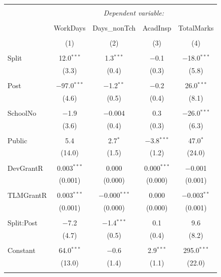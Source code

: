 \documentclass[12pt, a4paper]{article}
\begin{document}
\begin{table}[!htbp] \centering 
  \caption{} 
  \label{} 
\begin{tabular}{@{\extracolsep{5pt}}lcccc} 
\\[-1.8ex]\hline 
\hline \\[-1.8ex] 
 & \multicolumn{4}{c}{\textit{Dependent variable:}} \\ 
\cline{2-5} 
\\[-1.8ex] & WorkDays & Days\_nonTch & AcadInsp & TotalMarks \\ 
\\[-1.8ex] & (1) & (2) & (3) & (4)\\ 
\hline \\[-1.8ex] 
 Split & 12.0$^{***}$ & 1.3$^{***}$ & $-$0.1 & $-$18.0$^{***}$ \\ 
  & (3.3) & (0.4) & (0.3) & (5.8) \\ 
  & & & & \\ 
 Post & $-$97.0$^{***}$ & $-$1.2$^{**}$ & $-$0.2 & 26.0$^{***}$ \\ 
  & (4.6) & (0.5) & (0.4) & (8.1) \\ 
  & & & & \\ 
 SchoolNo & $-$1.9 & $-$0.004 & 0.3 & $-$26.0$^{***}$ \\ 
  & (3.6) & (0.4) & (0.3) & (6.3) \\ 
  & & & & \\ 
 Public & 5.4 & 2.7$^{*}$ & $-$3.8$^{***}$ & 47.0$^{*}$ \\ 
  & (14.0) & (1.5) & (1.2) & (24.0) \\ 
  & & & & \\ 
 DevGrantR & 0.003$^{***}$ & 0.000 & 0.000$^{***}$ & $-$0.001 \\ 
  & (0.001) & (0.000) & (0.000) & (0.001) \\ 
  & & & & \\ 
 TLMGrantR & 0.003$^{***}$ & $-$0.000$^{***}$ & 0.000 & $-$0.003$^{**}$ \\ 
  & (0.001) & (0.000) & (0.000) & (0.001) \\ 
  & & & & \\ 
 Split:Post & $-$7.2 & $-$1.4$^{***}$ & 0.1 & 9.6 \\ 
  & (4.7) & (0.5) & (0.4) & (8.2) \\ 
  & & & & \\ 
 Constant & 64.0$^{***}$ & $-$0.6 & 2.9$^{***}$ & 295.0$^{***}$ \\ 
  & (13.0) & (1.4) & (1.1) & (22.0) \\ 
  & & & & \\ 

\end{tabular}
\end{table}
\end{document}
